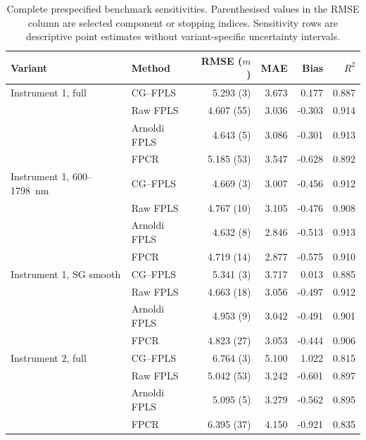 \begin{table}[htbp]
    \centering
    \small
    \caption[Complete prespecified benchmark sensitivities]{Complete prespecified benchmark sensitivities.  Parenthesised
    values in the RMSE column are selected component or stopping indices.
    Sensitivity rows are descriptive point estimates without variant-specific
    uncertainty intervals.}
    \label{tab:app-spectroscopy-sensitivities}
    \begin{tabular}{@{}llrrrr@{}}
        \toprule
        Variant & Method & RMSE ($m$) & MAE & Bias & $R^2$ \\
        \midrule
        Instrument 1, full
          & CG--FPLS     & 5.293 (3)  & 3.673 &  0.177 & 0.887 \\
          & Raw FPLS     & 4.607 (55) & 3.036 & -0.303 & 0.914 \\
          & Arnoldi FPLS & 4.643 (5)  & 3.086 & -0.301 & 0.913 \\
          & FPCR         & 5.185 (53) & 3.547 & -0.628 & 0.892 \\
        \addlinespace
        Instrument 1, 600--1798~nm
          & CG--FPLS     & 4.669 (3)  & 3.007 & -0.456 & 0.912 \\
          & Raw FPLS     & 4.767 (10) & 3.105 & -0.476 & 0.908 \\
          & Arnoldi FPLS & 4.632 (8)  & 2.846 & -0.513 & 0.913 \\
          & FPCR         & 4.719 (14) & 2.877 & -0.575 & 0.910 \\
        \addlinespace
        Instrument 1, SG smooth
          & CG--FPLS     & 5.341 (3)  & 3.717 &  0.013 & 0.885 \\
          & Raw FPLS     & 4.663 (18) & 3.056 & -0.497 & 0.912 \\
          & Arnoldi FPLS & 4.953 (9)  & 3.042 & -0.491 & 0.901 \\
          & FPCR         & 4.823 (27) & 3.053 & -0.444 & 0.906 \\
        \addlinespace
        Instrument 2, full
          & CG--FPLS     & 6.764 (3)  & 5.100 &  1.022 & 0.815 \\
          & Raw FPLS     & 5.042 (53) & 3.242 & -0.601 & 0.897 \\
          & Arnoldi FPLS & 5.095 (5)  & 3.279 & -0.562 & 0.895 \\
          & FPCR         & 6.395 (37) & 4.150 & -0.921 & 0.835 \\
        \bottomrule
    \end{tabular}
\end{table}

